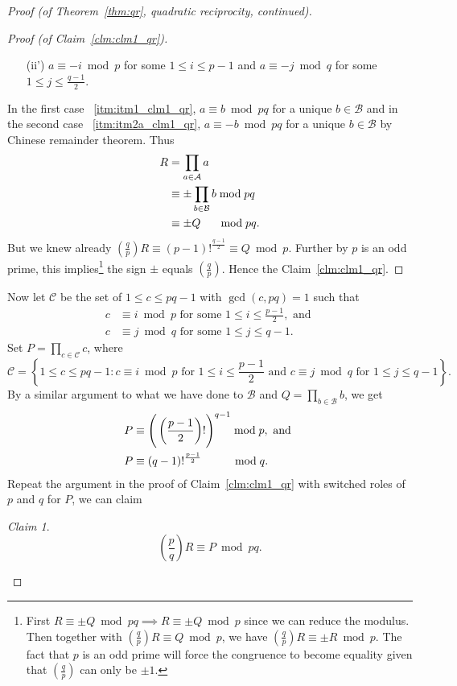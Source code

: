 \documentclass{amsbook}
\theoremstyle{plain}
\theoremstyle{definition}
\theoremstyle{remark}
\newtheorem{claim}[theorem]{Claim}
\numberwithin{equation}{chapter}
\numberwithin{figure}{chapter}
\newcommand{\sA}{\mathcal{A}}
\newcommand{\sB}{\mathcal{B}}
\newcommand{\sC}{\mathcal{C}}
\begin{document}
\begin{proof}[Proof {\rm (of Theorem~\ref{thm:qr}, quadratic reciprocity, continued)}]
\begin{proof}[Proof {\rm (of Claim~\ref{clm:clm1_qr})}]
\begin{enumerate}[label=(\roman*)]
\item[(ii')]\def\@currentlabel{(ii')} $a \equiv -i \bmod p$ for some $1 \leqslant i \leqslant p - 1$ and 
 $a \equiv -j \bmod q$ for some $1 \leqslant j \leqslant \frac{q - 1}2$. \label{itm:itm2a_clm1_qr}
\end{enumerate}
In the first case ~\ref{itm:itm1_clm1_qr}, $a \equiv b \bmod pq$ for a unique $b \in \sB$ and in the second case ~\ref{itm:itm2a_clm1_qr}, $a \equiv -b \bmod pq$ for a unique $b \in \sB$ by Chinese remainder theorem. Thus
\begin{align}
  R &= \prod_{a \in \sA} a \\
    &\equiv \pm \prod_{b \in \sB} b \bmod pq \\
    &\equiv \pm Q \hspace{5.4mm} \bmod pq.
\end{align}
But we knew already $\left( \frac{q}p \right) R \equiv (p-1)!^{\frac{q-1}2} \equiv Q \bmod p$. Further by $p$ is an odd prime, this implies\footnote{First $R \equiv \pm Q \bmod pq \implies R \equiv \pm Q \bmod p$ since we can reduce the modulus. Then together with $\left( \frac{q}p \right)R \equiv Q \bmod p$, we have $\left( \frac{q}p \right) R \equiv \pm R \bmod p$. The fact that $p$ is an odd prime will force the congruence to become equality given that $\left( \frac{q}p  \right)$ can only be $\pm 1$.} the sign $\pm$ equals $\left( \frac{q}p \right)$. Hence the Claim~\ref{clm:clm1_qr}.
\end{proof}

Now let $\sC$ be the set of $1 \leqslant c \leqslant pq - 1$ with $\gcd (c, pq) = 1$ such that 
\begin{align}
c &\equiv i \bmod p \text{ for some } 1 \leqslant i \leqslant \frac{p-1}2, \text{ and } \\
c &\equiv j \bmod q \text{ for some } 1 \leqslant j \leqslant q-1.
\end{align}
Set $P = \prod_{c \in \sC} c$, where
\[
\sC = \left\{ 1 \leqslant c \leqslant pq-1 : c \equiv i \bmod p \text{ for $1 \leqslant i \leqslant \frac{p-1}2$} \text{ and } c \equiv j \bmod q \text{ for $1 \leqslant j \leqslant q-1 $} \right\}.
\]
By a similar argument to what we have done to $\sB$ and $Q = \prod_{b \in \sB} b$, we get 
\begin{align}
P &\equiv \Bigg(\left( \frac{p-1}2 \right)!\Bigg)^{q-1} \bmod p, \text{ and }\label{eqn:P_mod_p}\\
P &\equiv (q-1)!^{\frac{p-1}2} \hspace{9.5mm}\bmod q. \label{eqn:P_mod_q}
\end{align}
Repeat the argument in the proof of Claim~\ref{clm:clm1_qr} with switched roles of $p$ and $q$ for $P$, we can claim
\begin{claim}\label{clm:clm2_qr}
\[
\left( \frac{p}q \right) R \equiv P \bmod pq.
\]
\end{claim}


\end{proof}
\end{document}
